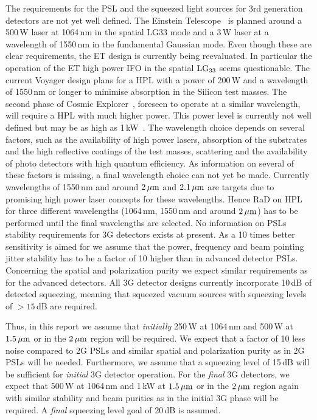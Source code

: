 The requirements for the \ac{PSL} and the squeezed light sources for 3rd generation detectors are not yet well defined. The Einstein Telescope~\cite{ET2011} is planned around a 500\,W laser at 1064\,nm in the spatial \ac{LG33} mode and a 3\,W laser at a wavelength of 1550\,nm in the fundamental Gaussian mode.
Even though these are clear requirements, the \ac{ET} design is currently being reevaluated. In particular the operation of the \ac{ET} high power \ac{IFO} in the spatial $\rm LG_{33}$ seems questionable. The current Voyager design plans for a \ac{HPL} with a power of 200\,W and a wavelength of 1550\,nm or longer to minimise absorption in the Silicon test masses. The second phase of Cosmic Explorer~\cite{CosmicExplorer2017}, foreseen to operate at a similar wavelength, will require a \ac{HPL} with much higher power. This power level is currently not well defined but may be as high as 1\,kW~\cite{GWADW2018,ISWP:2018}. The wavelength choice depends on several factors, such as the availability of high power lasers, absorption of the substrates and the high reflective coatings of the test masses, scattering and the availability of photo detectors with high quantum efficiency. As information on several of these factors is missing, a final wavelength choice can not yet be made. Currently wavelengths of 1550\,nm and around $\rm 2\, \mu m $ and $\rm 2.1\, \mu m $ are targets due to promising high power laser concepts for these wavelengths. Hence \ac{RaD} on \ac{HPL} for three different wavelengths (1064\,nm, 1550\,nm and around $\rm 2\, \mu m $) has to be performed until the final wavelengths are selected. 
No information on \acp{PSL} stability requirements for \ac{3G}   detectors exists at present. As a 10 times better sensitivity is aimed for we assume that the power, frequency and beam pointing jitter stability has to be a factor of 10 higher than in advanced detector \acp{PSL}. Concerning the spatial and polarization purity we expect similar requirements as for the advanced detectors.
All \ac{3G}   detector designs currently incorporate 10\,dB of detected squeezing, meaning that squeezed vacuum sources with squeezing levels of $> 15$\,dB are required.

Thus, in this report we assume that \emph{initially} 250\,W at 1064\,nm and 500\,W at  $ 1.5\, {\rm \mu m}$ or in the $ 2\, {\rm \mu m}$ region will be required. We expect that a factor of 10 less noise compared to \ac{2G}  \acp{PSL} and similar spatial and polarization purity as in \ac{2G}  \acp{PSL} will be needed. Furthermore, we assume that a squeezing level of 15\,dB will be sufficient for \emph{initial} \ac{3G}   detector operation. For the \emph{final} \ac{3G}   detectors, we expect that  500\,W at 1064\,nm and 1\,kW at  $ 1.5\, {\rm \mu m}$ or in the $ 2\, {\rm \mu m}$ region again with similar stability and beam purities as in the initial \ac{3G}   phase will be required. A \emph{final} squeezing level goal of 20\,dB is assumed.

